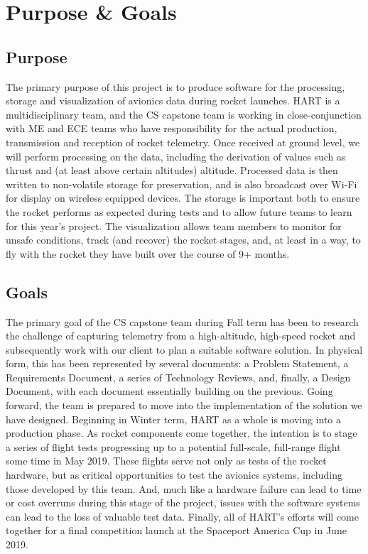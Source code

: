 \documentclass[journal,10pt,onecolumn,compsoc]{IEEEtran}
\begin{document}

\section{Purpose \& Goals}

	\subsection{Purpose}
		\noindent The primary purpose of this project is to produce software for the processing, storage and visualization of avionics data during rocket launches.
		HART is a multidisciplinary team, and the CS capstone team is working in close-conjunction with ME and ECE teams who have responsibility for the actual production, transmission and reception of rocket telemetry.
		Once received at ground level, we will perform processing on the data, including the derivation of values such as thrust and (at least above certain altitudes) altitude.
		Processed data is then written to non-volatile storage for preservation, and is also broadcast over Wi-Fi for display on wireless equipped devices.
		The storage is important both to ensure the rocket performs as expected during tests and to allow future teams to learn for this year's project.
		The visualization allows team members to monitor for unsafe conditions, track (and recover) the rocket stages, and, at least in a way, to fly with the rocket they have built over the course of 9+ months.
	
	\subsection{Goals}
		\noindent The primary goal of the CS capstone team during Fall term has been to research the challenge of capturing telemetry from a high-altitude, high-speed rocket and subsequently work with our client to plan a suitable software solution.
		In physical form, this has been represented by several documents: a Problem Statement, a Requirements Document, a series of Technology Reviews, and, finally, a Design Document, with each document essentially building on the previous.
		Going forward, the team is prepared to move into the implementation of the solution we have designed.
		Beginning in Winter term, HART as a whole is moving into a production phase.
		As rocket components come together, the intention is to stage a series of flight tests progressing up to a potential full-scale, full-range flight some time in May 2019.
		These flights serve not only as tests of the rocket hardware, but as critical opportunities to test the avionics systems, including those developed by this team.
		And, much like a hardware failure can lead to time or cost overruns during this stage of the project, issues with the software systems can lead to the loss of valuable test data.
		Finally, all of HART's efforts will come together for a final competition launch at the Spaceport America Cup in June 2019.
\newpage
\end{document}
